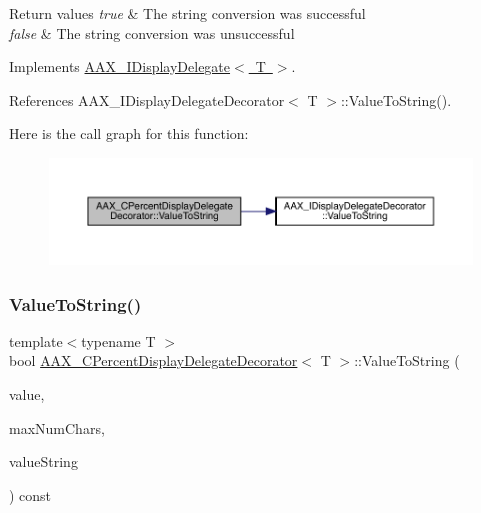 \begin{DoxyRetVals}{Return values}
{\em true} & The string conversion was successful \\
\hline
{\em false} & The string conversion was unsuccessful \\
\hline
\end{DoxyRetVals}


Implements \mbox{\hyperlink{a01801_a7fd1e2f55055c817937bbfa66b73b2fd}{A\+A\+X\+\_\+\+I\+Display\+Delegate$<$ T $>$}}.



References A\+A\+X\+\_\+\+I\+Display\+Delegate\+Decorator$<$ T $>$\+::\+Value\+To\+String().

Here is the call graph for this function\+:
\nopagebreak
\begin{figure}[H]
\begin{center}
\leavevmode
\includegraphics[width=350pt]{a01549_a06407f0b1287891bf658bc4e4166e2e4_cgraph}
\end{center}
\end{figure}
\mbox{\label{a01549_a80f4b7189ac37a15550e9f1846fcbfd7}} 
\subsubsection{\texorpdfstring{ValueToString()}{ValueToString()}\hspace{0.1cm}{\footnotesize\ttfamily [2/2]}}
{\footnotesize\ttfamily template$<$typename T $>$ \\
bool \mbox{\hyperlink{a01549}{A\+A\+X\+\_\+\+C\+Percent\+Display\+Delegate\+Decorator}}$<$ T $>$\+::Value\+To\+String (\begin{DoxyParamCaption}\item[{T}]{value,  }\item[{int32\+\_\+t}]{max\+Num\+Chars,  }\item[{\mbox{\hyperlink{a01573}{A\+A\+X\+\_\+\+C\+String}} $\ast$}]{value\+String }\end{DoxyParamCaption}) const\hspace{0.3cm}{\ttfamily [virtual]}}



